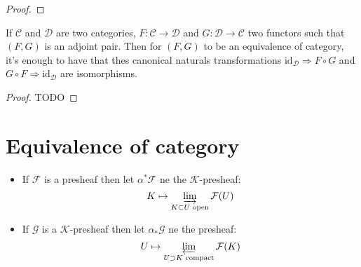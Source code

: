 \begin{proof}



\end{proof}

\begin{lemma}\label{lem:equiv_of_adj}
    If $\mathcal{C}$ and $\mathcal{D}$ are two categories, $F:\mathcal{C}\to \mathcal{D}$ and $G:\mathcal{D}\to \mathcal{C}$ two functors such that $(F,G)$ is an adjoint pair. Then for $(F,G)$ to be an equivalence of category, it's enough to have that thes canonical naturals transformations $\text{id}_{\mathcal{D}}\Rightarrow F\circ G$ and $G\circ F\Rightarrow \text{id}_{\mathcal{D}}$ are isomorphisms.
\end{lemma}

\begin{proof}
    TODO%
\end{proof}


\section{Equivalence of category}

\begin{definition}\label{def:adj_kprshv_and_prshv}
    \begin{itemize}
        \item If $\mathcal{F}$ is a presheaf then let $\alpha^*\mathcal{F}$ ne the $\mathcal{K}$-presheaf:\[K\mapsto \varinjlim\limits_{K\subset U \text{ open}}\mathcal{F}(U)\]
        \item If $\mathcal{G}$ is a $\mathcal{K}$-presheaf then let $\alpha_*\mathcal{G}$ ne the presheaf:\[ U\mapsto \varprojlim\limits_{U\supset K \text{ compact}}\mathcal{F}(K)\]
    \end{itemize}
\end{definition}

